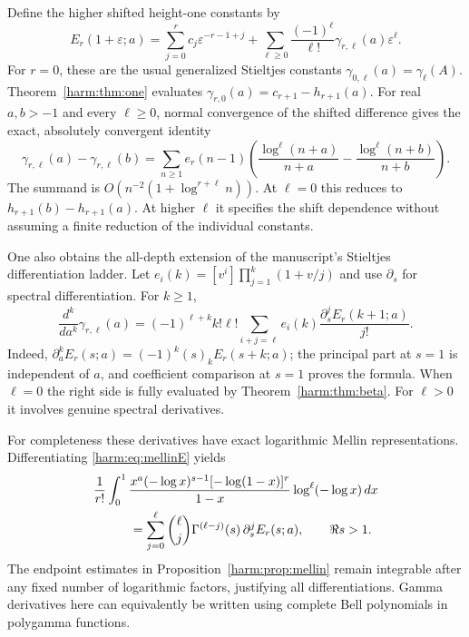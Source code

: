 \documentclass[11pt,letterpaper]{article}
\numberwithin{equation}{section}
\theoremstyle{plain}
\theoremstyle{definition}
\theoremstyle{remark}
\begin{document}
Define the higher shifted height-one constants by
\begin{equation}\label{harm:eq:Stieltjes}
 E_r(1+\varepsilon;a)
 =\sum_{j=0}^{r}c_j\varepsilon^{-r-1+j}
     +\sum_{\ell\geq0}\frac{(-1)^\ell}{\ell!}
                   \gamma_{r,\ell}(a)\varepsilon^\ell.
\end{equation}
For $r=0$, these are the usual generalized Stieltjes constants
$\gamma_{0,\ell}(a)=\gamma_\ell(A)$.
Theorem~\ref{harm:thm:one} evaluates
$\gamma_{r,0}(a)=c_{r+1}-h_{r+1}(a)$.
For real $a,b>-1$ and every $\ell\geq0$, normal convergence of the
shifted difference gives the exact, absolutely convergent identity
\begin{equation}\label{harm:eq:shiftStieltjes}
 \gamma_{r,\ell}(a)-\gamma_{r,\ell}(b)
  =\sum_{n\geq1}e_r(n-1)
       \left(\frac{\log^\ell(n+a)}{n+a}
                  -\frac{\log^\ell(n+b)}{n+b}\right).
\end{equation}
The summand is $O(n^{-2}(1+\log^{r+\ell}n))$.  At $\ell=0$
this reduces to $h_{r+1}(b)-h_{r+1}(a)$.  At higher $\ell$ it
specifies the shift dependence without assuming a finite reduction
of the individual constants.

One also obtains the all-depth extension of the manuscript's
Stieltjes differentiation ladder.  Let
$e_i(k)=[v^i]\prod_{j=1}^k(1+v/j)$ and use $\partial_s$ for
spectral differentiation.  For $k\geq1$,
\begin{equation}\label{harm:eq:Stieltjesderivative}
 \frac{d^k}{da^k}\gamma_{r,\ell}(a)
 =(-1)^{\ell+k}k!\ell!
      \sum_{i+j=\ell}e_i(k)
             \frac{\partial_s^j E_r(k+1;a)}{j!}.
\end{equation}
Indeed, $\partial_a^kE_r(s;a)=(-1)^k(s)_kE_r(s+k;a)$;
the principal part at $s=1$ is independent of $a$, and coefficient
comparison at $s=1$ proves the formula.  When $\ell=0$ the right
side is fully evaluated by Theorem~\ref{harm:thm:beta}.  For
$\ell>0$ it involves genuine spectral derivatives.

For completeness these derivatives have exact logarithmic Mellin
representations.  Differentiating \eqref{harm:eq:mellinE} yields
\begin{align}
 &\frac1{r!}\int_0^1
   \frac{x^a(-\log x)^{s-1}[-\log(1-x)]^r}{1-x}
                     \log^\ell(-\log x)\,dx\notag\\
 &\hspace{1cm}
 =\sum_{j=0}^{\ell}\binom{\ell}{j}
      \Gamma^{(\ell-j)}(s)\,\partial_s^jE_r(s;a),
      \qquad \Re s>1.\label{harm:eq:logspectral}
\end{align}
The endpoint estimates in Proposition~\ref{harm:prop:mellin} remain
integrable after any fixed number of logarithmic factors, justifying
all differentiations.  Gamma derivatives here can equivalently be
written using complete Bell polynomials in polygamma functions.
\end{document}
